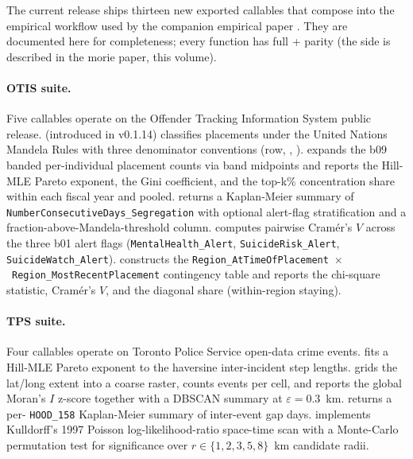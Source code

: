 \documentclass[article,shortnames,nojss]{jss}
\begin{document}
The current release ships thirteen new exported callables that compose
into the empirical workflow used by the companion empirical paper
\citep{Ruhela2026MorieEmpirical}.  They are documented here for
completeness; every function has full  + 
parity (the  side is described in the morie
 paper, this volume).

\paragraph{OTIS suite.}  Five callables operate on the Offender
Tracking Information System public release.  
(introduced in v0.1.14) classifies placements under the United Nations
Mandela Rules with three denominator conventions (row,
, ).
 expands the b09 banded
per-individual placement counts via band midpoints and reports the
Hill-MLE Pareto exponent, the Gini coefficient, and the top-k\%
concentration share within each fiscal year and pooled.
 returns a Kaplan-Meier summary of
\texttt{NumberConsecutiveDays\_Segregation} with optional alert-flag
stratification and a fraction-above-Mandela-threshold column.
 computes pairwise
Cram\'er's $V$ across the three b01 alert flags
(\texttt{MentalHealth\_Alert}, \texttt{SuicideRisk\_Alert},
\texttt{SuicideWatch\_Alert}).  
constructs the
\texttt{Region\_AtTimeOfPlacement}~$\times$~\texttt{Region\_MostRecentPlacement}
contingency table and reports the chi-square statistic, Cram\'er's
$V$, and the diagonal share (within-region staying).

\paragraph{TPS suite.}  Four callables operate on Toronto Police
Service open-data crime events.   fits
a Hill-MLE Pareto exponent to the haversine inter-incident step
lengths.   grids the lat/long
extent into a coarse raster, counts events per cell, and reports
the global Moran's $I$ z-score together with a DBSCAN summary at
$\varepsilon = 0.3$~km.
 returns a per-
\texttt{HOOD\_158} Kaplan-Meier summary of inter-event gap days.
 implements Kulldorff's 1997
Poisson log-likelihood-ratio space-time scan
\citep{kulldorff1997} with a Monte-Carlo permutation test for
significance over $r \in \{1, 2, 3, 5, 8\}$~km candidate radii.
\end{document}

